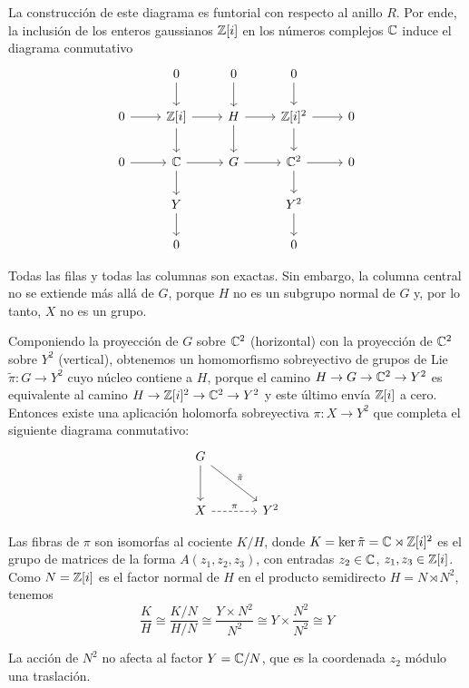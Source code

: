 \begin{solution}
\begin{enumerate}[label=\alph*)]
    La construcción de este diagrama es funtorial con respecto al anillo $R$. Por ende, la inclusión de los enteros gaussianos $\mathbb Z[i]$ en los números complejos $\mathbb C$ induce el diagrama conmutativo
    $$
    \begin{tikzcd}
         & 0        \d & 0    \d & 0          \d & \\
    0 \r & \Z[i] \r \d & H \r \d & \Z[i]^2 \r \d & 0 \\
    0 \r & \C    \r \d & G \r    & \C^2    \r \d & 0 \\
         & Y        \d &         & Y^2        \d & \\
         & 0           &         & 0
    \end{tikzcd}
    $$
    
    Todas las filas y todas las columnas son exactas. Sin embargo, la columna central no se extiende más allá de $G$, porque $H$ no es un subgrupo normal de $G$ y, por lo tanto, $X$ no es un grupo.
    
    Componiendo la proyección de $G$ sobre $\mathbb C^2$ (horizontal) con la proyección de $\mathbb C^2$ sobre $Y^2$ (vertical), obtenemos un homomorfismo sobreyectivo de grupos de Lie $\tilde \pi : G \to Y^2$ cuyo núcleo contiene a $H$, porque el camino $H \to G \to \mathbb C^2 \to Y^2$ es equivalente al camino $H \to \mathbb Z[i]^2 \to \mathbb C^2 \to Y^2$ y este último envía $\mathbb Z[i]$ a cero. Entonces existe una aplicación holomorfa sobreyectiva $\pi : X \to Y^2$ que completa el siguiente diagrama conmutativo:
    $$
    \begin{tikzcd}[row sep=large, column sep=large]
    G \arrow[d] \arrow[rd, "\tilde \pi"] & \\
    X \arrow[r, "\pi", dashed] & Y^2
    \end{tikzcd}
    $$
    
    Las fibras de $\pi$ son isomorfas al cociente $K/H$, donde $K = \ker \tilde \pi = \mathbb C \rtimes \mathbb Z[i]^2$ es el grupo de matrices de la forma $A(z_1, z_2, z_3)$, con entradas $z_2 \in \mathbb C$, $z_1, z_3 \in \mathbb Z[i]$. Como $N = \mathbb Z[i]$ es el factor normal de $H$ en el producto semidirecto $H = N \rtimes N^2$, tenemos
    $$\frac KH \cong \frac {K/N} {H/N} \cong \frac {Y \times N^2} {N^2} \cong Y \times \frac {N^2} {N^2} \cong Y$$
    
    La acción de $N^2$ no afecta al factor $Y = \mathbb C/N$, que es la coordenada $z_2$ módulo una traslación.
\end{enumerate}
\end{solution}
